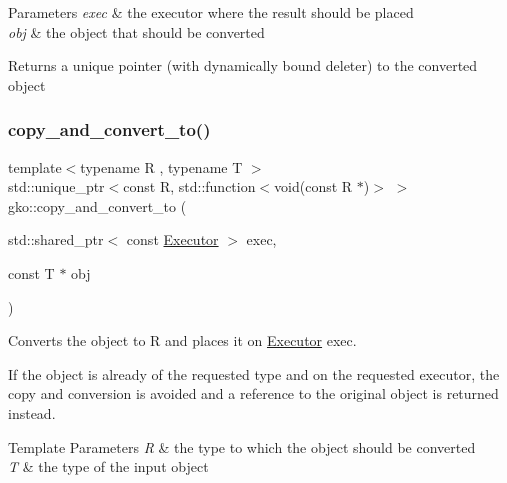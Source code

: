 \begin{DoxyParams}{Parameters}
{\em exec} & the executor where the result should be placed \\
\hline
{\em obj} & the object that should be converted\\
\hline
\end{DoxyParams}
\begin{DoxyReturn}{Returns}
a unique pointer (with dynamically bound deleter) to the converted object 
\end{DoxyReturn}
\mbox{\label{namespacegko_add859060efaa729c84788bb4f6582e9f}} 
\subsubsection{\texorpdfstring{copy\+\_\+and\+\_\+convert\+\_\+to()}{copy\_and\_convert\_to()}\hspace{0.1cm}{\footnotesize\ttfamily [2/2]}}
{\footnotesize\ttfamily template$<$typename R , typename T $>$ \\
std\+::unique\+\_\+ptr$<$const R, std\+::function$<$void(const R $\ast$)$>$ $>$ gko\+::copy\+\_\+and\+\_\+convert\+\_\+to (\begin{DoxyParamCaption}\item[{std\+::shared\+\_\+ptr$<$ const \hyperlink{classgko_1_1Executor}{Executor} $>$}]{exec,  }\item[{const T $\ast$}]{obj }\end{DoxyParamCaption})}



Converts the object to R and places it on \hyperlink{classgko_1_1Executor}{Executor} exec. 

If the object is already of the requested type and on the requested executor, the copy and conversion is avoided and a reference to the original object is returned instead.


\begin{DoxyTemplParams}{Template Parameters}
{\em R} & the type to which the object should be converted \\
\hline
{\em T} & the type of the input object\\
\hline
\end{DoxyTemplParams}

